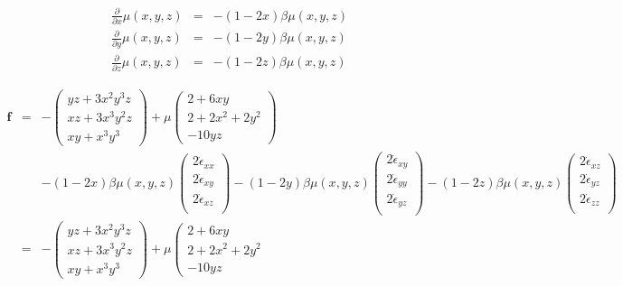 \begin{eqnarray}
\frac{\partial }{\partial x} \mu(x,y,z) &=& -(1-2x)\beta \mu(x,y,z) \nonumber\\
\frac{\partial }{\partial y} \mu(x,y,z) &=& -(1-2y)\beta \mu(x,y,z) \nonumber\\
\frac{\partial }{\partial z} \mu(x,y,z) &=& -(1-2z)\beta \mu(x,y,z) \nonumber
\end{eqnarray}

\begin{eqnarray}
{\bm f} 
&=& 
-
\left(
\begin{array}{c}
yz+3x^2y^3z\\
xz +3x^3y^2z \\
xy+x^3y^3
\end{array}
\right)
+\mu
\left(
\begin{array}{c}
2+6xy  \\
2 + 2x^2 +  2y^2 \\
-10yz 
\end{array}
\right) \\
&&
-(1-2x)\beta \mu (x,y,z)
\left(
\begin{array}{c}
2\dot{\epsilon}_{xx} \\
2\dot{\epsilon}_{xy} \\
2\dot{\epsilon}_{xz} \\
\end{array}
\right)
-(1-2y)\beta \mu (x,y,z)
\left(
\begin{array}{c}
2\dot{\epsilon}_{xy} \\
2\dot{\epsilon}_{yy} \\
2\dot{\epsilon}_{yz} \\
\end{array}
\right)
-(1-2z)\beta \mu (x,y,z)
\left(
\begin{array}{c}
2\dot{\epsilon}_{xz} \\
2\dot{\epsilon}_{yz} \\
2\dot{\epsilon}_{zz} \\
\end{array}
\right) \nonumber\\
&=& 
-
\left(
\begin{array}{c}
yz+3x^2y^3z\\
xz +3x^3y^2z \\
xy+x^3y^3
\end{array}
\right)
+\mu
\left(
\begin{array}{c}
2+6xy  \\
2 + 2x^2 +  2y^2 \\
-10yz 
\end{array}

\end{eqnarray}
